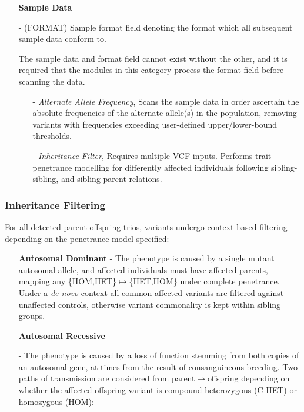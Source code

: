 \documentclass{bioinfo}
\begin{document}
\begin{methods}
\begin{enumerate}
{\begin{itemize}
	\end{itemize}
}

\item[]{\bf Sample Data}{ - (FORMAT) Sample format field denoting the format which all subsequent sample data conform to.

	The sample data and format field cannot exist without the other, and it is required that the modules in this category process the format field before scanning the data. 

	\begin{itemize}
	\item[-]{\it Alternate Allele Frequency}{, Scans the sample data in order ascertain the absolute frequencies of the alternate allele(s) in the population, removing variants with frequencies exceeding user-defined upper/lower-bound thresholds.}
	\item[-]{\it Inheritance Filter}{, Requires multiple VCF inputs. Performs trait penetrance modelling for differently affected individuals following sibling-sibling, and sibling-parent relations.}
	\end{itemize}
}
\end{enumerate}



\subsubsection{Inheritance Filtering}

For all detected parent-offspring trios, variants undergo context-based filtering depending on the penetrance-model specified:

\begin{itemize}

\item[]{\bf Autosomal Dominant}{ - The phenotype is caused by a single mutant autosomal allele, and affected individuals must have affected parents, mapping any \{HOM,HET\}$\mapsto$\{HET,HOM\} under complete penetrance. Under a \textit{de novo} context all common affected variants are filtered against unaffected controls, otherwise variant commonality is kept within sibling groups.}

\item[]{\bf Autosomal Recessive}{ - The phenotype is caused by a loss of function stemming from both copies of an autosomal gene, at times from the result of consanguineous breeding. Two paths of transmission are considered from parent$\mapsto$offspring depending on whether the affected offspring variant is compound-heterozygous (C-HET) or homozygous (HOM):

}
\end{itemize}
\end{methods}
\end{document}
